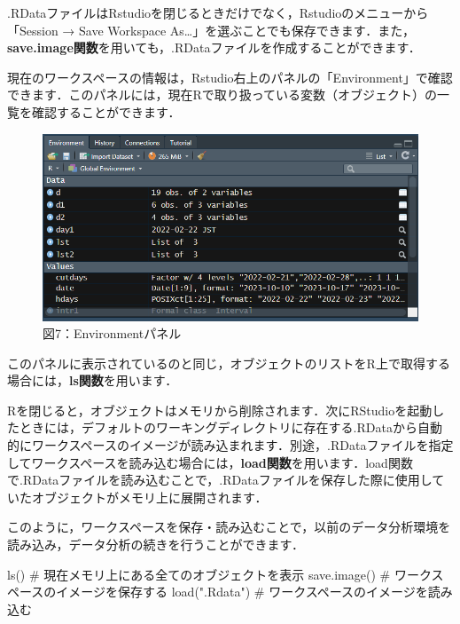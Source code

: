 \documentclass[
  letterpaper,
  DIV=11,
  numbers=noendperiod]{scrreprt}
\newenvironment{Shaded}{\begin{snugshade}}{\end{snugshade}}
\newcommand{\CommentTok}[1]{\textcolor[rgb]{0.37,0.37,0.37}{#1}}
\newcommand{\FunctionTok}[1]{\textcolor[rgb]{0.28,0.35,0.67}{#1}}
\newcommand{\NormalTok}[1]{\textcolor[rgb]{0.00,0.23,0.31}{#1}}
\newcommand{\StringTok}[1]{\textcolor[rgb]{0.13,0.47,0.30}{#1}}
\begin{document}
.RDataファイルはRstudioを閉じるときだけでなく，Rstudioのメニューから「Session
→ Save Workspace
As\ldots」を選ぶことでも保存できます．また，\textbf{save.image関数}を用いても，.RDataファイルを作成することができます．

現在のワークスペースの情報は，Rstudio右上のパネルの「Environment」で確認できます．このパネルには，現在Rで取り扱っている変数（オブジェクト）の一覧を確認することができます．

\begin{figure}

{\centering \includegraphics{././image/environment_pane.png}

}

\caption{図7：Environmentパネル}

\end{figure}

このパネルに表示されているのと同じ，オブジェクトのリストをR上で取得する場合には，\textbf{ls関数}を用います．

Rを閉じると，オブジェクトはメモリから削除されます．次にRStudioを起動したときには，デフォルトのワーキングディレクトリに存在する.RDataから自動的にワークスペースのイメージが読み込まれます．別途，.RDataファイルを指定してワークスペースを読み込む場合には，\textbf{load関数}を用います．load関数で.RDataファイルを読み込むことで，.RDataファイルを保存した際に使用していたオブジェクトがメモリ上に展開されます．

このように，ワークスペースを保存・読み込むことで，以前のデータ分析環境を読み込み，データ分析の続きを行うことができます．

\begin{Shaded}
\begin{Highlighting}[]
\FunctionTok{ls}\NormalTok{() }\CommentTok{\# 現在メモリ上にある全てのオブジェクトを表示}
\FunctionTok{save.image}\NormalTok{() }\CommentTok{\# ワークスペースのイメージを保存する}
\FunctionTok{load}\NormalTok{(}\StringTok{".Rdata"}\NormalTok{) }\CommentTok{\# ワークスペースのイメージを読み込む}
\end{Highlighting}
\end{Shaded}
\end{document}
